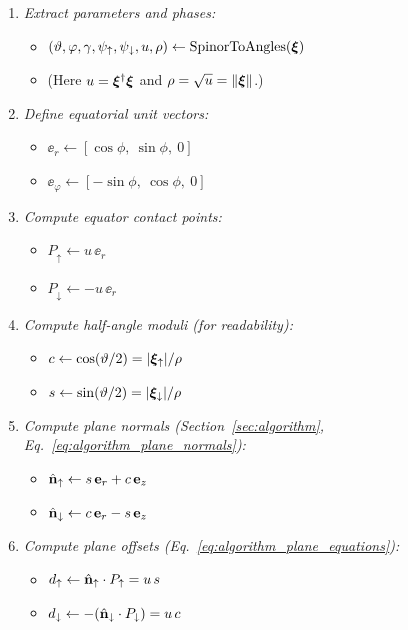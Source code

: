 \begin{enumerate}
\item \textit{Extract parameters and phases:}
\begin{itemize}
    \item $(\vartheta, \varphi, \gamma, \psi_\uparrow, \psi_\downarrow, u, \rho)\gets \mathrm{SpinorToAngles}(\bm{\xi})$
    \item (Here $u=\bm{\xi}^\dagger\bm{\xi}$ and $\rho=\sqrt{u}=\|\bm{\xi}\|$.)
\end{itemize}

\item \textit{Define equatorial unit vectors:}
\begin{itemize}
    \item $\ee_r \gets [\cos\phi,\ \sin\phi,\ 0]$
    \item $\ee_\varphi \gets [-\sin\phi,\ \cos\phi,\ 0]$
\end{itemize}

\item \textit{Compute equator contact points:}
\begin{itemize}
    \item $P_\uparrow \gets u\,\ee_r$
    \item $P_\downarrow \gets -u\,\ee_r$
\end{itemize}

\item \textit{Compute half-angle moduli (for readability):}
\begin{itemize}
    \item $c \gets \cos(\vartheta/2)=|\bm{\xi}_\uparrow|/\rho$
    \item $s \gets \sin(\vartheta/2)=|\bm{\xi}_\downarrow|/\rho$
\end{itemize}

\item \textit{Compute plane normals (Section~\ref{sec:algorithm}, Eq.~\eqref{eq:algorithm_plane_normals}):}
\begin{itemize}
    \item $\hat{\mathbf{n}}_\uparrow \gets s\,\mathbf{e}_r + c\,\mathbf{e}_{z}$
    \item $\hat{\mathbf{n}}_\downarrow \gets c\,\mathbf{e}_r - s\,\mathbf{e}_{z}$
\end{itemize}

\item \textit{Compute plane offsets (Eq.~\eqref{eq:algorithm_plane_equations}):}
\begin{itemize}
    \item $d_\uparrow \gets \hat{\mathbf{n}}_\uparrow\cdot P_\uparrow = u\,s$
    \item $d_\downarrow \gets -(\hat{\mathbf{n}}_\downarrow\cdot P_\downarrow)=u\,c$
\end{itemize}


\end{enumerate}
